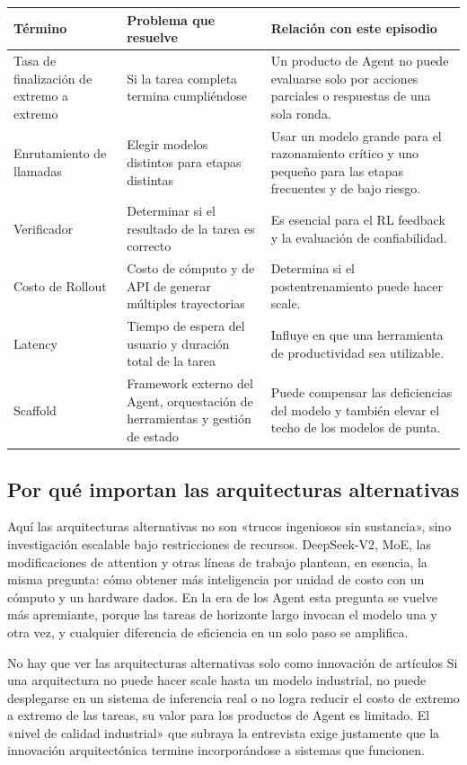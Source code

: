 \noindent\begin{tabularx}{\textwidth}{p{}p{}X}
\toprule
Término & Problema que resuelve & Relación con este episodio \\
\midrule
Tasa de finalización de extremo a extremo & Si la tarea completa termina cumpliéndose & Un producto de Agent no puede evaluarse solo por acciones parciales o respuestas de una sola ronda. \\
Enrutamiento de llamadas & Elegir modelos distintos para etapas distintas & Usar un modelo grande para el razonamiento crítico y uno pequeño para las etapas frecuentes y de bajo riesgo. \\
Verificador & Determinar si el resultado de la tarea es correcto & Es esencial para el RL feedback y la evaluación de confiabilidad. \\
Costo de Rollout & Costo de cómputo y de API de generar múltiples trayectorias & Determina si el postentrenamiento puede hacer scale. \\
Latency & Tiempo de espera del usuario y duración total de la tarea & Influye en que una herramienta de productividad sea utilizable. \\
Scaffold & Framework externo del Agent, orquestación de herramientas y gestión de estado & Puede compensar las deficiencias del modelo y también elevar el techo de los modelos de punta. \\
\bottomrule
\end{tabularx}

\subsection{Por qué importan las arquitecturas alternativas}

Aquí las arquitecturas alternativas no son «trucos ingeniosos sin sustancia», sino investigación escalable bajo restricciones de recursos. DeepSeek-V2, MoE, las modificaciones de attention y otras líneas de trabajo plantean, en esencia, la misma pregunta: cómo obtener más inteligencia por unidad de costo con un cómputo y un hardware dados. En la era de los Agent esta pregunta se vuelve más apremiante, porque las tareas de horizonte largo invocan el modelo una y otra vez, y cualquier diferencia de eficiencia en un solo paso se amplifica.

\begin{warningbox}{No hay que ver las arquitecturas alternativas solo como innovación de artículos}
Si una arquitectura no puede hacer scale hasta un modelo industrial, no puede desplegarse en un sistema de inferencia real o no logra reducir el costo de extremo a extremo de las tareas, su valor para los productos de Agent es limitado. El «nivel de calidad industrial» que subraya la entrevista exige justamente que la innovación arquitectónica termine incorporándose a sistemas que funcionen.
\end{warningbox}

